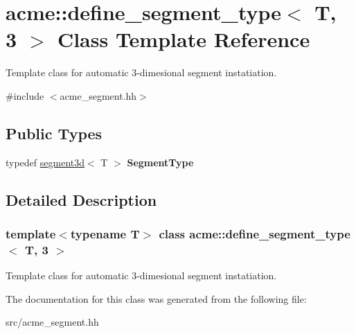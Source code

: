 \hypertarget{classacme_1_1define__segment__type_3_01_t_00_013_01_4}{}\section{acme\+:\+:define\+\_\+segment\+\_\+type$<$ T, 3 $>$ Class Template Reference}
\label{classacme_1_1define__segment__type_3_01_t_00_013_01_4}


Template class for automatic 3-\/dimesional segment instatiation.  




{\ttfamily \#include $<$acme\+\_\+segment.\+hh$>$}

\subsection*{Public Types}
\begin{DoxyCompactItemize}
\item 
\mbox{\label{classacme_1_1define__segment__type_3_01_t_00_013_01_4_a21b8e288088274b86b03b8a14b7e48c7}} 
typedef \hyperlink{classacme_1_1segment3d}{segment3d}$<$ T $>$ {\bfseries Segment\+Type}
\end{DoxyCompactItemize}


\subsection{Detailed Description}
\subsubsection*{template$<$typename T$>$\newline
class acme\+::define\+\_\+segment\+\_\+type$<$ T, 3 $>$}

Template class for automatic 3-\/dimesional segment instatiation. 

The documentation for this class was generated from the following file\+:\begin{DoxyCompactItemize}
\item 
src/acme\+\_\+segment.\+hh\end{DoxyCompactItemize}

